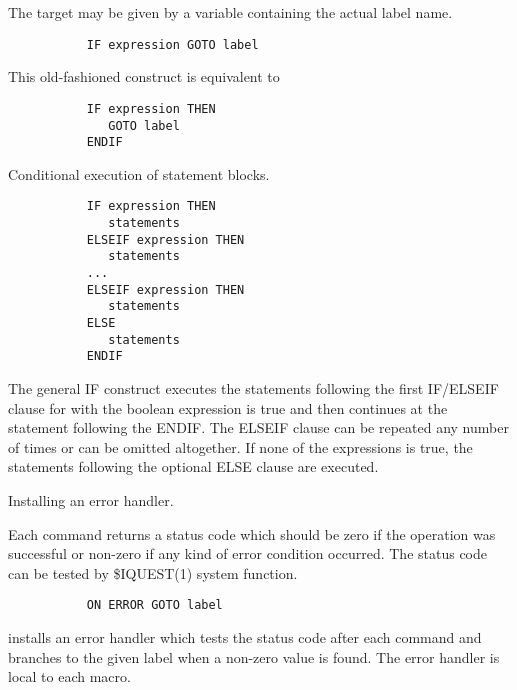    \par
The target may be given by a variable containing the actual label name.  

\begin{verbatim}
           IF expression GOTO label
\end{verbatim}
\ENDVERB
   \par
This old-fashioned construct is equivalent to 

\begin{verbatim}
           IF expression THEN
              GOTO label
           ENDIF
\end{verbatim}

\ENDCMD


   \par
Conditional execution of statement blocks.  

\begin{verbatim}
           IF expression THEN
              statements
           ELSEIF expression THEN
              statements
           ...
           ELSEIF expression THEN
              statements
           ELSE
              statements
           ENDIF
\end{verbatim}
\ENDVERB
   \par
The general IF construct executes the statements following the first 
   IF/ELSEIF clause for with the boolean expression is true and then continues 
   at the statement following the ENDIF. The ELSEIF clause can be repeated any 
   number of times or can be omitted altogether. If none of the expressions is 
   true, the statements following the optional ELSE clause are executed.  

\ENDCMD


   \par
Installing an error handler.  

   \par
Each command returns a status code which should be zero if the operation 
   was successful or non-zero if any kind of error condition occurred.  The 
   status code can be tested by \$IQUEST(1) system function.  

\begin{verbatim}
           ON ERROR GOTO label
\end{verbatim}
\ENDVERB
   \par
installs an error handler which tests the status code after each command 
   and branches to the given label when a non-zero value is found.  The error 
   handler is local to each macro.  

